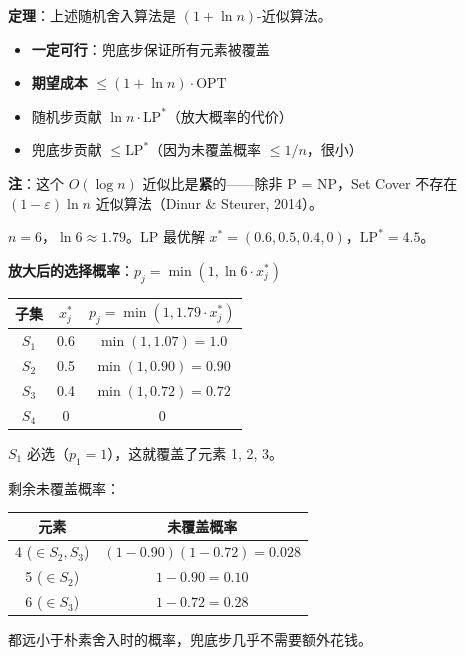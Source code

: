 \documentclass[12pt, a4paper]{ctexart}
\begin{document}
\begin{blackboard}

\textbf{定理}：上述随机舍入算法是 $(1 + \ln n)$-近似算法。
\begin{itemize}
    \item \textbf{一定可行}：兜底步保证所有元素被覆盖
    \item \textbf{期望成本} $\leq (1+\ln n) \cdot \text{OPT}$
    \item 随机步贡献 $\ln n \cdot \text{LP}^*$（放大概率的代价）
    \item 兜底步贡献 $\leq \text{LP}^*$（因为未覆盖概率 $\leq 1/n$，很小）
\end{itemize}

\textbf{注}：这个 $O(\log n)$ 近似比是\textbf{紧}的——除非 P = NP，Set Cover 不存在 $(1-\varepsilon)\ln n$ 近似算法（Dinur \& Steurer, 2014）。

\end{blackboard}

\begin{blackboard}[回到具体例子]

$n = 6$，$\ln 6 \approx 1.79$。LP 最优解 $x^* = (0.6, 0.5, 0.4, 0)$，$\text{LP}^* = 4.5$。

\textbf{放大后的选择概率}：$p_j = \min(1, \ln 6 \cdot x_j^*)$
\begin{center}
\begin{tabular}{c|c|c}
子集 & $x_j^*$ & $p_j = \min(1, 1.79 \cdot x_j^*)$ \\
\hline
$S_1$ & 0.6 & $\min(1, 1.07) = \mathbf{1.0}$ \\
$S_2$ & 0.5 & $\min(1, 0.90) = 0.90$ \\
$S_3$ & 0.4 & $\min(1, 0.72) = 0.72$ \\
$S_4$ & 0 & $0$
\end{tabular}
\end{center}

$S_1$ 必选（$p_1 = 1$），这就覆盖了元素 1, 2, 3。

剩余未覆盖概率：
\begin{center}
\begin{tabular}{c|c}
元素 & 未覆盖概率 \\
\hline
4 ($\in S_2, S_3$) & $(1-0.90)(1-0.72) = 0.028$ \\
5 ($\in S_2$) & $1-0.90 = 0.10$ \\
6 ($\in S_3$) & $1-0.72 = 0.28$
\end{tabular}
\end{center}

都远小于朴素舍入时的概率，兜底步几乎不需要额外花钱。

\end{blackboard}
\end{document}

